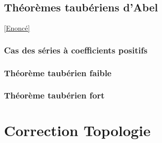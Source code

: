 \documentclass{book}
\begin{document}
	\subsection{Théorèmes taubériens d'Abel}
	\label{sec:theoremes-tauberiens-dabel}
	\textcolor{blue}{\hyperref[Théorème taubériens d'Abel]{[Enoncé]}}\\
	
	\subsubsection{Cas des séries à coefficients positifs}
	
	\subsubsection{Théorème taubérien faible}
	
	\subsubsection{Théorème taubérien fort}
	
	\newpage
\section{Correction Topologie}
\end{document}
